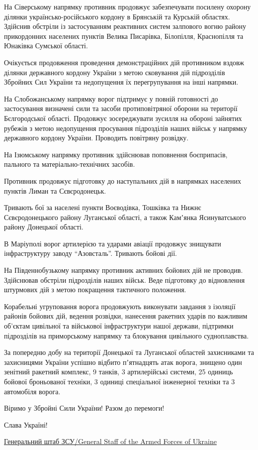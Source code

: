 На Сіверському напрямку противник продовжує забезпечувати посилену охорону
ділянки українсько-російського кордону в Брянській та Курській областях.
Здійснив обстріли із застосуванням реактивних систем залпового вогню району
прикордонних населених пунктів Велика Писарівка, Білопілля, Краснопілля та
Юнаківка Сумської області.

Очікується продовження проведення демонстраційних дій противником вздовж
ділянки державного кордону України з метою сковування дій підрозділів Збройних
Сил України та недопущення їх перегрупування на інші напрямки.

На Слобожанському напрямку ворог підтримує у повній готовності до застосування
визначені сили та засоби протиповітряної оборони на території Бєлгородської
області. Продовжує зосереджувати зусилля на обороні зайнятих рубежів з метою
недопущення просування підрозділів наших військ у напрямку державного кордону
України. Проводить повітряну розвідку.

На Ізюмському напрямку противник здійснював поповнення боєприпасів, пального та
матеріально-технічних засобів.

Противник продовжує підготовку до наступальних дій в напрямках населених
пунктів Лиман та Сєвєродонецьк. 

Тривають бої за населені пункти Воєводівка, Тошківка та Нижнє Сєвєродонецького
району Луганської області, а також Камʼянка Ясинуватського району Донецької
області.

В Маріуполі ворог артилерією та ударами авіації продовжує знищувати
інфраструктуру заводу \enquote{Азовсталь}. Тривають бойові дії.

На Південнобузькому напрямку противник активних бойових дій не проводив.
Здійснював обстріли підрозділів наших військ. Веде підготовку до відновлення
штурмових дій з метою покращення тактичного положення. 

Корабельні угруповання ворога продовжують виконувати завдання з ізоляції
районів бойових дій, ведення розвідки, нанесення ракетних ударів по важливим
об’єктам цивільної та військової інфраструктури нашої держави, підтримки
підрозділів на приморському напрямку та блокування цивільного судноплавства.

За попередню добу на території Донецької та Луганської областей захисниками та
захисницями України успішно відбито пʼятнадцять атак ворога, знищено один
зенітний ракетний комплекс, 9 танків, 3 артилерійські системи, 25 одиниць
бойової броньованої техніки, 3 одиниці спеціальної інженерної техніки та 3
автомобіля ворога.

Віримо у Збройні Сили України! Разом до перемоги! 

Слава Україні!

\href{https://www.facebook.com/GeneralStaff.ua}{Генеральний штаб ЗСУ/General Staff of the Armed Forces of Ukraine}
